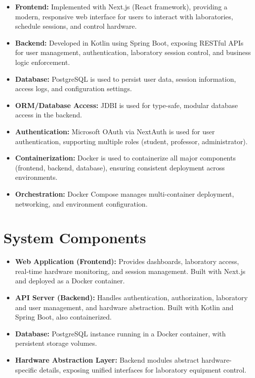\begin{itemize}
    \item \textbf{Frontend:} Implemented with Next.js (React framework), providing a modern, responsive web interface for users to interact with laboratories, schedule sessions, and control hardware.
    \item \textbf{Backend:} Developed in Kotlin using Spring Boot, exposing RESTful APIs for user management, authentication, laboratory session control, and business logic enforcement.
    \item \textbf{Database:} PostgreSQL is used to persist user data, session information, access logs, and configuration settings.
    \item \textbf{ORM/Database Access:} JDBI is used for type-safe, modular database access in the backend.
    \item \textbf{Authentication:} Microsoft OAuth via NextAuth is used for user authentication, supporting multiple roles (student, professor, administrator).
    \item \textbf{Containerization:} Docker is used to containerize all major components (frontend, backend, database), ensuring consistent deployment across environments.
    \item \textbf{Orchestration:} Docker Compose manages multi-container deployment, networking, and environment configuration.
\end{itemize}

\section{System Components}

\begin{itemize}
    \item \textbf{Web Application (Frontend):} Provides dashboards, laboratory access, real-time hardware monitoring, and session management. Built with Next.js and deployed as a Docker container.
    \item \textbf{API Server (Backend):} Handles authentication, authorization, laboratory and user management, and hardware abstraction. Built with Kotlin and Spring Boot, also containerized.
    \item \textbf{Database:} PostgreSQL instance running in a Docker container, with persistent storage volumes.
    \item \textbf{Hardware Abstraction Layer:} Backend modules abstract hardware-specific details, exposing unified interfaces for laboratory equipment control.
\end{itemize}

